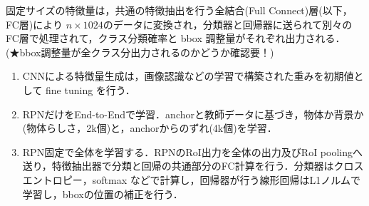 \documentclass[originalpaper,fleqn]{jsaiart}     %
\begin{document}
固定サイズの特徴量は，共通の特徴抽出を行う全結合(Full Connect)層(以下，FC層)により $n{\times}1024$のデータに変換され，分類器と回帰器に送られて別々のFC層で処理されて，クラス分類確率と bbox 調整量がそれぞれ出力される．(★bbox調整量が全クラス分出力されるのかどうか確認要！)

\begin{enumerate}
    \item CNNによる特徴量生成は，画像認識などの学習で構築された重みを初期値として fine tuning を行う．
    \item RPNだけをEnd-to-Endで学習．anchorと教師データに基づき，物体か背景か(物体らしさ，2k個)と，anchorからのずれ(4k個)を学習．
    \item RPN固定で全体を学習する．RPNのRoI出力を全体の出力及びRoI poolingへ送り，特徴抽出器で分類と回帰の共通部分のFC計算を行う．分類器はクロスエントロピー，softmax などで計算し，回帰器が行う線形回帰はL1ノルムで学習し，bboxの位置の補正を行う．
\end{enumerate}

\end{document}
